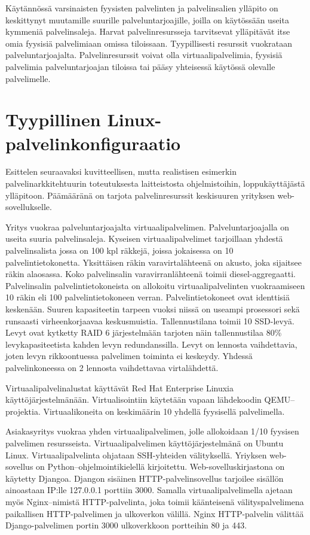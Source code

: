 Käytännössä varsinaisten fyysisten palvelinten ja palvelinsalien ylläpito on keskittynyt muutamille suurille palveluntarjoajille, joilla on käytössään useita kymmeniä palvelinsaleja. Harvat palvelinresursseja tarvitsevat ylläpitävät itse omia fyysisiä palvelimiaan omissa tiloissaan. Tyypillisesti resurssit vuokrataan palveluntarjoajalta. Palvelinresurssit voivat olla virtuaalipalvelimia, fyysisiä palvelimia palveluntarjoajan tiloissa tai pääsy yhteisessä käytössä olevalle palvelimelle.~\cite{golden2011virtualization}

\section{Tyypillinen Linux-palvelinkonfiguraatio}\label{tyypillinen_palvelinkonfiguraatio}

    Esittelen seuraavaksi kuvitteellisen, mutta realistisen esimerkin palvelinarkkitehtuurin toteutuksesta laitteistosta ohjelmistoihin, loppukäyttäjästä ylläpitoon. Päämääränä on tarjota palvelinresurssit keskisuuren yrityksen web-sovellukselle.

    Yritys vuokraa palveluntarjoajalta virtuaalipalvelimen. Palveluntarjoajalla on useita suuria palvelinsaleja. Kyseisen virtuaalipalvelimet tarjoillaan yhdestä palvelinsalista jossa on 100 kpl räkkejä, joissa jokaisessa on 10 palvelintietokonetta. Yksittäisen räkin varavirtalähteenä on akusto, joka sijaitsee räkin alaosassa. Koko palvelinsalin varavirranlähteenä toimii diesel-aggregaatti. Palvelinsalin palvelintietokoneista on allokoitu virtuaalipalvelinten vuokraamiseen 10 räkin eli 100 palvelintietokoneen verran. Palvelintietokoneet ovat identtisiä keskenään. Suuren kapasiteetin tarpeen vuoksi niissä on useampi prosessori sekä runsaasti virheenkorjaavaa keskusmuistia. Tallennustilana toimii 10 SSD-levyä. Levyt ovat kytketty RAID 6 järjestelmään tarjoten näin tallennustilaa 80\% levykapasiteetista kahden levyn redundanssilla. Levyt on lennosta vaihdettavia, joten levyn rikkoontuessa palvelimen toiminta ei keskeydy. Yhdessä palvelinkoneessa on 2 lennosta vaihdettavaa virtalähdettä.

    Virtuaalipalvelinalustat käyttävät Red Hat Enterprise Linuxia käyttöjärjestelmänään. Virtualisointiin käytetään vapaan lähdekoodin QEMU–projektia. Virtuaalikoneita on keskimäärin 10 yhdellä fyysisellä palvelimella.

    Asiakasyritys vuokraa yhden virtuaalipalvelimen, jolle allokoidaan 1/10 fyysisen palvelimen resursseista. Virtuaalipalvelimen käyttöjärjestelmänä on Ubuntu Linux. Virtuaalipalvelinta ohjataan SSH-yhteiden välityksellä. Yriyksen web-sovellus on Python–ohjelmointikielellä kirjoitettu. Web-sovelluskirjastona on käytetty Djangoa. Djangon sisäinen HTTP-palvelinsovellus tarjoilee sisällön ainoastaan IP:lle 127.0.0.1 porttiin 3000. Samalla virtuaalipalvelimella ajetaan myös Nginx–nimistä HTTP-palvelinta, joka toimii käänteisenä välityspalvelimena paikallisen HTTP-palvelimen ja ulkoverkon välillä. Nginx HTTP-palvelin välittää Django-palvelimen portin 3000 ulkoverkkoon portteihin 80 ja 443.

